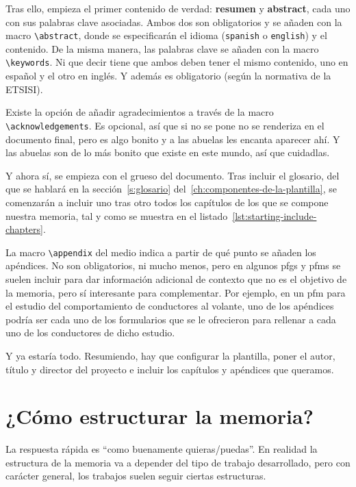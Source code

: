 Tras ello, empieza el primer contenido de verdad: \textbf{resumen} y \textbf{abstract}, cada uno con sus palabras clave asociadas. Ambos dos son obligatorios y se añaden con la macro \lstinline{\abstract}, donde se especificarán el idioma (\texttt{spanish} o \texttt{english}) y el contenido. De la misma manera, las palabras clave se añaden con la macro \lstinline{\keywords}. Ni que decir tiene que ambos deben tener el mismo contenido, uno en español y el otro en inglés. Y además es obligatorio (según la normativa de la ETSISI).

Existe la opción de añadir agradecimientos a través de la macro \lstinline{\acknowledgements}. Es opcional, así que si no se pone no se renderiza en el documento final, pero es algo bonito y a las abuelas les encanta aparecer ahí. Y las abuelas son de lo más bonito que existe en este mundo, así que cuidadlas.

Y ahora sí, se empieza con el grueso del documento. Tras incluir el glosario, del que se hablará en la sección~\ref{s:glosario} del~\ref{ch:componentes-de-la-plantilla}, se comenzarán a incluir uno tras otro todos los capítulos de los que se compone nuestra memoria, tal y como se muestra en el listado~\ref{lst:starting-include-chapters}.



La macro \lstinline{\appendix} del medio indica a partir de qué punto se añaden los apéndices. No son obligatorios, ni mucho menos, pero en algunos \glspl{pfg} y \glspl{pfm} se suelen incluir para dar información adicional de contexto que no es el objetivo de la memoria, pero sí interesante para complementar. Por ejemplo, en un \gls{pfm} para el estudio del comportamiento de conductores al volante, uno de los apéndices podría ser cada uno de los formularios que se le ofrecieron para rellenar a cada uno de los conductores de dicho estudio.

Y ya estaría todo. Resumiendo, hay que configurar la plantilla, poner el autor, título y director del proyecto e incluir los capítulos y apéndices que queramos.

\section{¿Cómo estructurar la memoria?}
\label{s:como-estructurar}

La respuesta rápida es \enquote{como buenamente quieras/puedas}. En realidad la estructura de la memoria va a depender del tipo de trabajo desarrollado, pero con carácter general, los trabajos suelen seguir ciertas estructuras.

